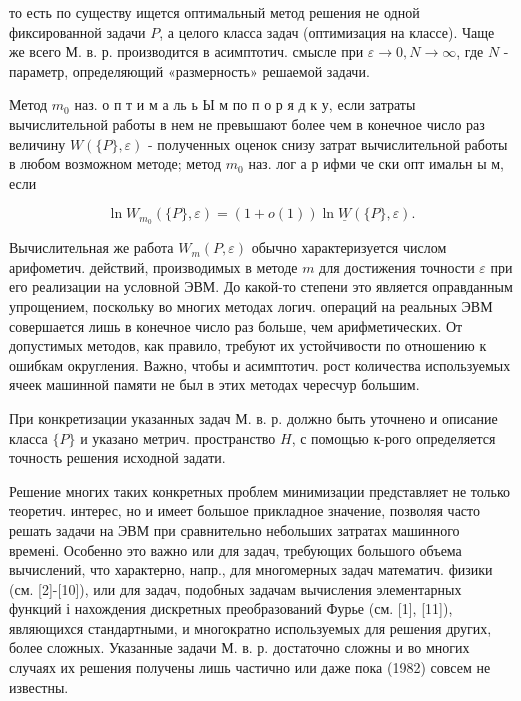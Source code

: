 \documentclass[10pt]{article}
\begin{document}
то есть по существу ищется оптимальный метод решения не одной фиксированной задачи $P$, а целого класса задач (оптимизация на классе). Чаще же всего М. в. р. производится в асимптотич. смысле при $\varepsilon \rightarrow 0, N \rightarrow \infty$, где $N$ - параметр, определяющий «размерность» решаемой задачи.



Метод $m_{0}$ наз. о п т и м а ль ь Ы м по п о р я д к у, если затраты вычислительной работы в нем не превышают более чем в конечное число раз величину $W(\{P\}, \varepsilon)$ - полученных оценок снизу затрат вычислительной работы в любом возможном методе; метод $m_{0}$ наз. лог а р ифми че ски опт имальн ы м, если



\[

\ln W_{m_{0}}(\{P\}, \varepsilon)=(1+o(1)) \ln \underline{W}(\{P\}, \varepsilon) .

\]



Вычислительная же работа $W_{m}(P, \varepsilon)$ обычно характеризуется числом арифометич. действий, производимых в методе $m$ для достижения точности $\varepsilon$ при его реализации на условной ЭВМ. До какой-то степени это является оправданным упрощением, поскольку во многих методах логич. операций на реальных ЭВМ совершается лишь в конечное число раз больше, чем арифметических. От допустимых методов, как правило, требуют их устойчивости по отношению к ошибкам округления. Важно, чтобы и асимптотич. рост количества используемых ячеек машинной памяти не был в этих методах чересчур большим.



При конкретизации указанных задач М. в. р. должно быть уточнено и описание класса $\{P\}$ и указано метрич. пространство $H$, с помощью к-рого определяется точность решения исходной задати.



Решение многих таких конкретных проблем минимизации представляет не только теоретич. интерес, но и имеет большое прикладное значение, позволяя часто решать задачи на ЭВМ при сравнительно небольших затратах машинного времені. Особенно это важно или для задач, требующих большого объема вычислений, что характерно, напр., для многомерных задач математич. физики (см. [2]-[10]), или для задач, подобных задачам вычисления элементарных функций і нахождения дискретных преобразований Фурье (см. [1], [11]), являющихся стандартными, и многократно используемых для решения других, более сложных. Указанные задачи М. в. р. достаточно сложны и во многих случаях их решения получены лишь частично или даже пока (1982) совсем не известны.
\end{document}
